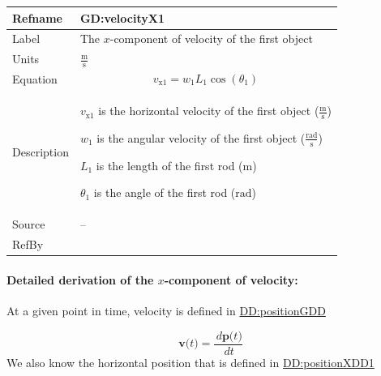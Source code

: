 \documentclass[12pt]{article}
\begin{document}
\vspace{\baselineskip}
\noindent
\begin{minipage}{\textwidth}
\begin{tabular}{>{\raggedright}p{}>{\raggedright\arraybackslash}p{}}
\toprule \textbf{Refname} & \textbf{GD:velocityX1}
\label{GD:velocityX1}
\\ \midrule
Label & The $x$-component of velocity of the first object
        
\\ \midrule
Units & $\frac{\text{m}}{\text{s}}$
        
\\ \midrule
Equation & \begin{displaymath}
           {v_{\text{x}1}}={w_{1}} {L_{1}} \cos\left({θ_{1}}\right)
           \end{displaymath}
\\ \midrule
Description & \begin{symbDescription}
              \item{${v_{\text{x}1}}$ is the horizontal velocity of the first object ($\frac{\text{m}}{\text{s}}$)}
              \item{${w_{1}}$ is the angular velocity of the first object ($\frac{\text{rad}}{\text{s}}$)}
              \item{${L_{1}}$ is the length of the first rod (${\text{m}}$)}
              \item{${θ_{1}}$ is the angle of the first rod (${\text{rad}}$)}
              \end{symbDescription}
\\ \midrule
Source & --
         
\\ \midrule
RefBy & 
\\ \bottomrule
\end{tabular}
\end{minipage}
\paragraph{Detailed derivation of the $x$-component of velocity:}
\label{GD:velocityX1Deriv}
At a given point in time, velocity is defined in \hyperref[DD:positionGDD]{DD:positionGDD}

\begin{displaymath}
\symbf{v}\text{(}t\text{)}=\frac{\,d\symbf{p}\text{(}t\text{)}}{\,dt}
\end{displaymath}
We also know the horizontal position that is defined in \hyperref[DD:positionXDD1]{DD:positionXDD1}
\end{document}
